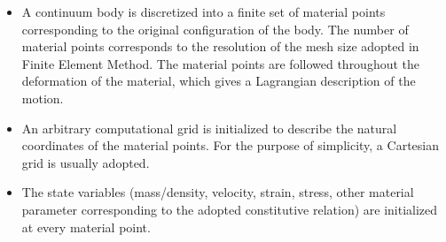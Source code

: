 \begin{itemize}
\item
A continuum body is discretized into a finite set of material points 
corresponding to the original configuration of the body. The number of material 
points corresponds to the resolution of the mesh size adopted in Finite Element 
Method. The material points are followed throughout the deformation of the 
material, which gives a Lagrangian description of the motion. 
\item
An arbitrary computational grid is initialized to describe the natural 
coordinates of the material points. For the purpose of simplicity, a Cartesian 
grid is usually adopted. 
\item
The state variables (mass/density, velocity, strain, stress, other material 
parameter corresponding to the adopted constitutive relation) are initialized 
at every material point. 


\end{itemize}

